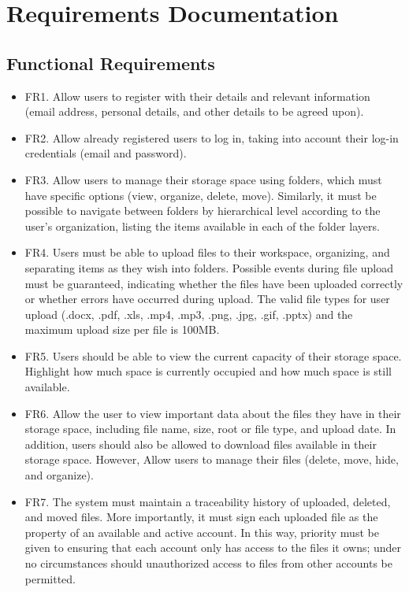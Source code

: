 \section{Requirements Documentation}
\subsection{Functional Requirements}
\begin{itemize}
    \item FR1. Allow users to register with their details and relevant information (email address, personal details, and other details to be agreed upon).
    \item FR2. Allow already registered users to log in, taking into account their log-in credentials (email and password).
    \item FR3. Allow users to manage their storage space using folders, which must have specific options (view, organize, delete, move). Similarly, it must be possible to navigate between folders by hierarchical level according to the user's organization, listing the items available in each of the folder layers.
    \item FR4. Users must be able to upload files to their workspace, organizing, and separating items as they wish into folders. Possible events during file upload must be guaranteed, indicating whether the files have been uploaded correctly or whether errors have occurred during upload. The valid file types for user upload (.docx, .pdf, .xls, .mp4, .mp3, .png, .jpg, .gif, .pptx) and the maximum upload size per file is 100MB.
    \item FR5. Users should be able to view the current capacity of their storage space. Highlight how much space is currently occupied and how much space is still available.
    \item FR6. Allow the user to view important data about the files they have in their storage space, including file name, size, root or file type, and upload date. In addition, users should also be allowed to download files available in their storage space.
    However, Allow users to manage their files (delete, move, hide, and organize).
    \item FR7. The system must maintain a traceability history of uploaded, deleted, and moved files. More importantly, it must sign each uploaded file as the property of an available and active account. In this way, priority must be given to ensuring that each account only has access to the files it owns; under no circumstances should unauthorized access to files from other accounts be permitted.

\end{itemize}
